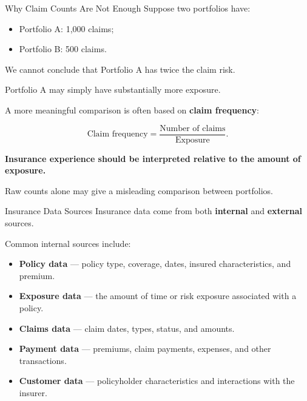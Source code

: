 \documentclass[
  ignorenonframetext,
  aspectratio=169,
]{beamer}
\providecommand{\tightlist}{%
  \setlength{\itemsep}{0pt}\setlength{\parskip}{0pt}}
\begin{document}
\begin{frame}{Why Claim Counts Are Not Enough}
\protect{}\label{why-claim-counts-are-not-enough}
Suppose two portfolios have:

\begin{itemize}
\tightlist
\item
  Portfolio A: 1,000 claims;
\item
  Portfolio B: 500 claims.
\end{itemize}

We cannot conclude that Portfolio A has twice the claim risk.

Portfolio A may simply have substantially more exposure.

A more meaningful comparison is often based on \textbf{claim frequency}:

\[
\text{Claim frequency}
=
\frac{\text{Number of claims}}
{\text{Exposure}}.
\]

\begin{tcolorbox}[enhanced jigsaw, arc=.35mm, bottomrule=.15mm, bottomtitle=1mm, breakable, colback=white, colbacktitle=quarto-callout-important-color!10!white, colframe=quarto-callout-important-color-frame, coltitle=black, left=2mm, leftrule=.75mm, opacityback=0, opacitybacktitle=0.6, rightrule=.15mm, title=\textcolor{quarto-callout-important-color}{\faExclamation}\hspace{0.5em}{Key idea}, titlerule=0mm, toprule=.15mm, toptitle=1mm]

\textbf{Insurance experience should be interpreted relative to the
amount of exposure.}

Raw counts alone may give a misleading comparison between portfolios.

\end{tcolorbox}
\end{frame}

\begin{frame}{Insurance Data Sources}
\protect{}\label{insurance-data-sources}
Insurance data come from both \textbf{internal} and \textbf{external}
sources.

Common internal sources include:

\begin{itemize}
\tightlist
\item
  \textbf{Policy data} --- policy type, coverage, dates, insured
  characteristics, and premium.
\item
  \textbf{Exposure data} --- the amount of time or risk exposure
  associated with a policy.
\item
  \textbf{Claims data} --- claim dates, types, status, and amounts.
\item
  \textbf{Payment data} --- premiums, claim payments, expenses, and
  other transactions.
\item
  \textbf{Customer data} --- policyholder characteristics and
  interactions with the insurer.
\end{itemize}
\end{frame}
\end{document}
